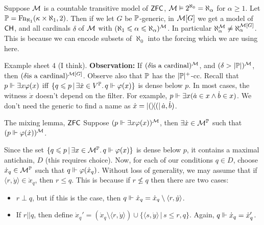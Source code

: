 \documentclass{article}
\begin{document}
    \begin{fancyprop}{}
        Suppose $\mathcal{M}$ is a countable transitive model of $\mathsf{ZFC}$, $\mathcal{M} \vDash 2^{\aleph_{0}}= \aleph_{\alpha}$ for $\alpha \geq 1$. Let $\mathbb{P} = \operatorname{Fn}_{\aleph_{1}}(\kappa \times \aleph_{1},2)$. Then if we let $G$ be $\mathbb{P}$-generic, in $\mathcal{M}[G]$ we get a model of $\mathsf{CH}$, and all cardinals $\delta$ of $\mathcal{M}$ with $(\aleph_{1} \leqslant \alpha \leqslant \aleph_{\alpha})^{\mathcal{M}}$. \gap
        In particular $\aleph_{\alpha}^{\mathcal{M}} \neq \aleph_{\alpha}^{\mathcal{M}[G]}$. This is because we can encode subsets of $\aleph_{0}$ into the forcing which we are using here.
    \end{fancyprop}
    \proof Example sheet 4 (I think).\gap
    \newlec
    \textbf{Observation:} If $(\delta \text{is a cardinal})^{\mathcal{M}}$, and $(\delta > |\mathbb{P}|)^{\mathcal{M}}$, then $(\delta \text{is a cardinal})^{\mathcal{M}[G]}$. Observe also that $\mathbb{P}$ has the $|\mathbb{P}|^{+}$-cc.\gap
    Recall that $p \Vdash \exists x \varphi(x)$ iff $\{q \leqslant p \, | \, \exists \dot{x} \in V^{\mathbb{P}}. \, q \Vdash \varphi(x)\}$ is dense below $p$. In most cases, the witness $\dot{x}$ doesn't depend on the filter. For example, $p \Vdash \exists x (\dot{a} \in x \wedge \dot{b} \in x)$. We don't need the generic to find a name as $\dot{x} = \op(\dot{a},\dot{b})$.
    \begin{fancylem}{The mixing lemma, $\mathsf{ZFC}$}
        Suppose $(p \Vdash \exists x \varphi(x))^{\mathcal{M}}$, then $\exists \dot{x} \in \mathcal{M}^{\mathbb{P}}$ such that $(p \Vdash \varphi(\dot{x}))^{\mathcal{M}}$.
    \end{fancylem}
    \proof Since the set $\{ q \leqslant p \, | \, \exists x \in \mathcal{M}^{\mathbb{P}}. \, q \Vdash \varphi(x)\}$ is dense below $p$, it contains a maximal antichain, $D$ (this requires choice). Now, for each of our conditions $q \in D$, choose $\dot{x}_{q} \in \mathcal{M}^{\mathbb{P}}$ such that $q \Vdash \varphi(\dot{x}_{q})$. Without loss of generality, we may assume that if $\langle r, \dot{y} \rangle \in \dot{x}_{q}$, then $r \leq q$. This is because if $r \nleq q$ then there are two cases: \begin{itemize}
        \item $r \perp q$, but if this is the case, then $q \Vdash \dot{x}_{q}=\dot{x}_{q} \setminus \langle r, \dot{y} \rangle$.
        \item If $r || q$, then define $\dot{x}_{q}' = (\dot{x}_{q} \setminus \langle r,\dot{y} \rangle) \cup \{ \langle s, \dot{y} \rangle \, | \, s \leq r,q\}$. Again, $q \Vdash \dot{x}_{q} = \dot{x}_{q}'$.
    \end{itemize}
\end{document}
